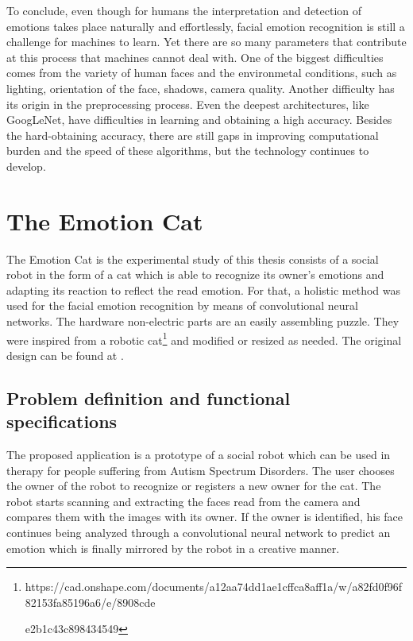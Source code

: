 \documentclass[runningheads,a4paper,12pt]{report}
\begin{document}
To conclude, even though for humans the interpretation and detection of emotions takes place naturally and effortlessly, facial emotion recognition is still a challenge for machines to learn. Yet there are so many parameters that contribute at this process that machines cannot deal with. One of the biggest difficulties comes from the variety of human faces and the environmetal conditions, such as lighting, orientation of the face, shadows, camera quality. Another difficulty has its origin in the preprocessing process. Even the deepest architectures, like GoogLeNet, have difficulties in learning and obtaining a high accuracy. Besides the hard-obtaining accuracy, there are still gaps in improving computational burden and the speed of these algorithms, but the technology continues to develop. 

\chapter{The Emotion Cat}
\label{chapter:robot}

The Emotion Cat is the experimental study of this thesis consists of a social robot in the form of a cat which is able to recognize its owner's emotions and adapting its reaction to reflect the read emotion. For that, a holistic method was used for the facial emotion recognition by means of convolutional neural networks. The hardware non-electric parts are an easily assembling puzzle. They were inspired from a robotic cat\footnote{https://cad.onshape.com/documents/a12aa74dd1ae1cffca8aff1a/w/a82fd0f96f82153fa85196a6/e/8908cde

e2b1c43c898434549} and modified or resized as needed. The original design can be found at \cite{nybble}.

\section{Problem definition and functional specifications}
\label{chapter:definition}
The proposed application is a prototype of a social robot which can be used in therapy for people suffering from Autism Spectrum Disorders. The user chooses the owner of the robot to recognize or registers a new owner for the cat. The robot starts scanning and extracting the faces read from the camera and compares them with the images with its owner. If the owner is identified, his face continues being analyzed through a convolutional neural network to predict an emotion which is finally mirrored by the robot in a creative manner. 
\end{document}
